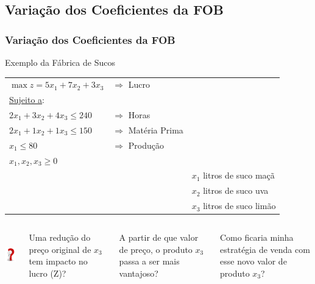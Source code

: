 \documentclass{beamer}
\begin{document}
\subsection{Variação dos Coeficientes da FOB}
\begin{frame}
	\frametitle{Variação dos Coeficientes da FOB}
	\begin{block}{Exemplo da Fábrica de Sucos}
		\begin{table}
			\begin{tabular}{l l l}
				$ \max z = 5x_1 + 7x_2 + 3x_3 $	& \color{red} $\Rightarrow$ Lucro  \\
				\underline{Sujeito a}: \\
				$2x_1 + 3x_2 + 4x_3 \le 240$ 	& \color{red} $\Rightarrow$ Horas \\
				$2x_1 + 1x_2 + 1x_3 \le 150$ 	& \color{red} $\Rightarrow$ Matéria Prima \\
				$x_1 \le 80$ 					& \color{red} $\Rightarrow$ Produção \\
				$x_1, x_2, x_3 \ge 0$ \\ 
				& & \scriptsize $x_1$ litros de suco maçã\\
				& & \scriptsize $x_2$ litros de suco uva\\
				& & \scriptsize $x_3$ litros de suco limão\\
			\end{tabular}
		\end{table}
	\end{block}
	\begin{columns}
		{
			\begin{column}{1cm}
				\centering
				\includegraphics[width=1.5cm,height=2cm]{doubt.jpg}
			\end{column}
		}
		\only<2>
		{
			\begin{column}{10cm}
				\Large
				Uma redução do preço original de $x_3$ tem impacto no lucro (Z)?
			\end{column}
		}
		\only<3>
		{
			\begin{column}{10cm}
				\Large
				A partir de que valor de preço, o produto $x_3$ passa a ser mais vantajoso?
			\end{column}
		}
		\only<4>
		{
			\begin{column}{10cm}
				\Large
				Como ficaria minha estratégia de venda com esse novo valor de produto $x_3$?
			\end{column}
		}


	\end{columns}
\end{frame}
\end{document}

